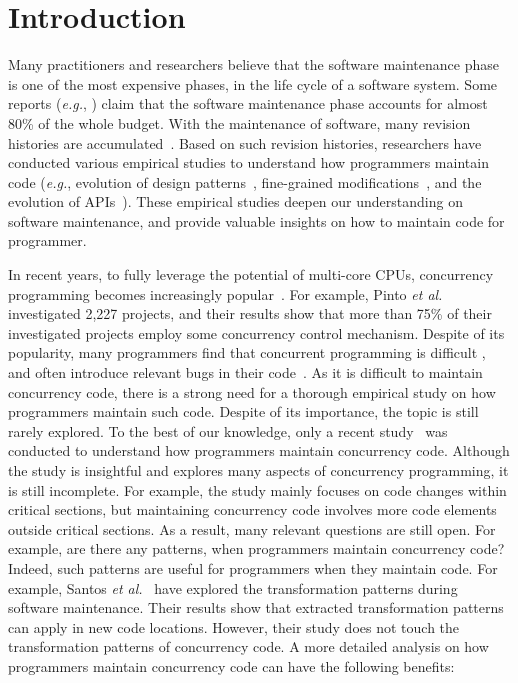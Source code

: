 \section{Introduction}
Many practitioners and researchers believe that the software maintenance phase is one of the most expensive phases, in the life cycle of a software system. Some reports (\emph{e.g.}, \cite{ahn2003software}) claim that the software maintenance phase accounts for almost 80\% of the whole budget. With the maintenance of software, many revision histories are accumulated~\cite{conf/icsm/Borges16}. Based on such revision histories, researchers have conducted various empirical studies to understand how programmers maintain code (\emph{e.g.}, evolution of design patterns~\cite{aversano2007empirical}, fine-grained modifications~\cite{german2006empirical}, and the evolution of APIs~\cite{mcdonnell2013empirical}). These empirical studies deepen our understanding on software maintenance, and provide valuable insights on how to maintain code for programmer.



In recent years, to fully leverage the potential of multi-core CPUs, concurrency programming becomes increasingly popular~\cite{journals/jss/PintoTFFB15}. For example, Pinto \emph{et al.}~\cite{journals/jss/PintoTFFB15} investigated 2,227 projects, and their results show that more than 75\% of their investigated projects employ some concurrency control mechanism. Despite of its popularity, many programmers find that concurrent programming is difficult \cite{journals/corr/McKenney17}, and often introduce relevant bugs in their code~\cite{conf/asplos/LuPSZ08}. As it is difficult to maintain concurrency code, there is a strong need for a thorough empirical study on how programmers maintain such code. Despite of its importance, the topic is still rarely explored. To the best of our knowledge, only a recent study~\cite{conf/sigsoft/GuJSZL15} was conducted to understand how programmers maintain concurrency code. Although the study is insightful and explores many aspects of concurrency programming, it is still incomplete. For example, the study mainly focuses on code changes within critical sections, but maintaining concurrency code involves more code elements outside critical sections. As a result, many relevant questions are still open. For example, are there any patterns, when programmers maintain concurrency code? Indeed, such patterns are useful for programmers when they maintain code. For example, Santos \emph{et al.}~\cite{conf/icsm/SantosAEDV15} have explored the transformation patterns during software maintenance. Their results show that extracted transformation patterns can apply in new code locations. However, their study does not touch the transformation patterns of concurrency code. A more detailed analysis on how programmers maintain concurrency code can have the following benefits:





